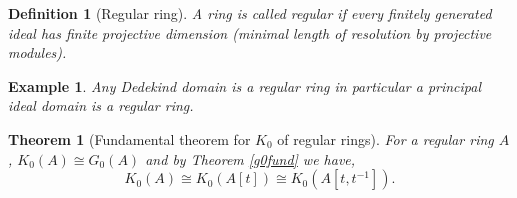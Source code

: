 \documentclass[12pt]{report}
\numberwithin{equation}{section}
\newtheorem{theorem}[dummy]{Theorem}
\newtheorem{definition}[dummy]{Definition}
\newtheorem{example}[dummy]{Example}
\begin{document}
	
	\begin{definition}[Regular ring] A ring is called regular if every finitely generated ideal has finite projective dimension (minimal length of resolution by projective modules).
	\end{definition}
	\begin{example}
		Any Dedekind domain is a regular ring in particular a principal ideal domain is a regular ring.
	\end{example}
	
	\begin{theorem}[Fundamental theorem for $K_0$ of regular rings]\label{extensionk0iscong}
		For a regular ring $A$, $K_0(A)\cong G_0(A)$ and by Theorem \ref{g0fund} we have, \[ K_0(A) \cong K_0(A[t]) \cong K_0(A[t,t^{-1}]) .\]
	\end{theorem}
	
	
	
\end{document}

